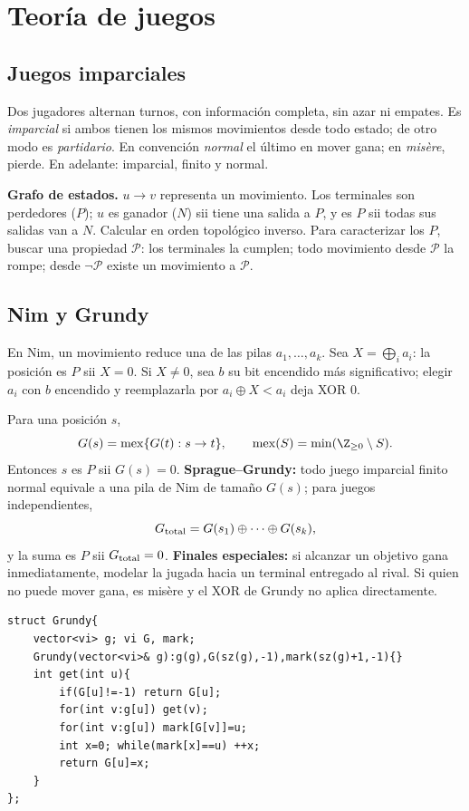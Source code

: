 \section{Teoría de juegos}

\subsection{Juegos imparciales}
Dos jugadores alternan turnos, con información completa, sin azar ni empates. Es \textit{imparcial} si ambos tienen los mismos movimientos desde todo estado; de otro modo es \textit{partidario}. En convención \textit{normal} el último en mover gana; en \textit{misère}, pierde. En adelante: imparcial, finito y normal.

\textbf{Grafo de estados.} $u\to v$ representa un movimiento. Los terminales son perdedores ($P$); $u$ es ganador ($N$) sii tiene una salida a $P$, y es $P$ sii todas sus salidas van a $N$. Calcular en orden topológico inverso. Para caracterizar los $P$, buscar una propiedad $\mathcal P$: los terminales la cumplen; todo movimiento desde $\mathcal P$ la rompe; desde $\neg\mathcal P$ existe un movimiento a $\mathcal P$.

\subsection{Nim y Grundy}
En Nim, un movimiento reduce una de las pilas $a_1,\dots,a_k$. Sea $X=\bigoplus_i a_i$: la posición es $P$ sii $X=0$. Si $X\ne0$, sea $b$ su bit encendido más significativo; elegir $a_i$ con $b$ encendido y reemplazarla por $a_i\oplus X<a_i$ deja XOR $0$.

Para una posición $s$,
\[
G(s)=\operatorname{mex}\{G(t):s\to t\},\qquad \operatorname{mex}(S)=\min(\Z_{\geq0}\setminus S).
\]
Entonces $s$ es $P$ sii $G(s)=0$. \textbf{Sprague--Grundy:} todo juego imparcial finito normal equivale a una pila de Nim de tamaño $G(s)$; para juegos independientes,
\[
G_{\rm total}=G(s_1)\oplus\cdots\oplus G(s_k),
\]
y la suma es $P$ sii $G_{\rm total}=0$. \textbf{Finales especiales:} si alcanzar un objetivo gana inmediatamente, modelar la jugada hacia un terminal entregado al rival. Si quien no puede mover gana, es misère y el XOR de Grundy no aplica directamente.

\begin{verbatim}
struct Grundy{
    vector<vi> g; vi G, mark;
    Grundy(vector<vi>& g):g(g),G(sz(g),-1),mark(sz(g)+1,-1){}
    int get(int u){
        if(G[u]!=-1) return G[u];
        for(int v:g[u]) get(v);
        for(int v:g[u]) mark[G[v]]=u;
        int x=0; while(mark[x]==u) ++x;
        return G[u]=x;
    }
};
\end{verbatim}

